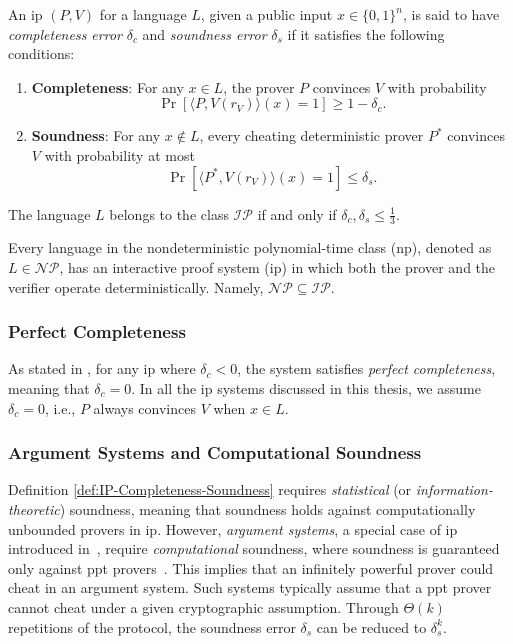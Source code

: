 \begin{definition}\label{def:IP-Completeness-Soundness}
	An \gls{ip} \( (P, V) \) for a language \( L \), given a public input \( x \in \{0,1\}^n \), is said to have \textit{completeness error} \( \delta_c \) and \textit{soundness error} \( \delta_s \) if it satisfies the following conditions:
	\begin{enumerate}[leftmargin=2em]
		\item \textbf{Completeness}: For any \( x \in L \), the prover \( P \) convinces \( V \) with probability
		\[
		\Pr [\langle P, V(r_V) \rangle (x) = 1] \geq 1 - \delta_c.
		\]
		\item \textbf{Soundness}: For any \( x \notin L \), every cheating deterministic prover \( P^* \) convinces \( V \) with probability at most
		\[
		\Pr [\langle P^*, V(r_V) \rangle (x) = 1] \leq \delta_s.
		\]
	\end{enumerate}
The language \( L \) belongs to the class \( \mathcal{IP} \) if and only if \( \delta_c, \delta_s \leq \frac{1}{3} \).

\end{definition}

\begin{remark}\label{remark:np_in_ip}
Every language in the nondeterministic polynomial-time class (\gls{np}), denoted as \( L \in \mathcal{NP} \), has an interactive proof system (\gls{ip}) in which both the prover and the verifier operate deterministically. Namely, $\mathcal{NP} \subseteq \mathcal{IP}$.
\end{remark}

\subsubsection{Perfect Completeness}
As stated in \cite{Thaler2022Proofs}, for any \gls{ip} where \( \delta_c < 0 \), the system satisfies \textit{perfect completeness}, meaning that \( \delta_c = 0 \). In all the \gls{ip} systems discussed in this thesis, we assume \(\delta_c = 0\), i.e.,  \( P \) always convinces \( V \) when \( x \in L \). 

\subsubsection{Argument Systems and Computational Soundness}
Definition \ref{def:IP-Completeness-Soundness} requires \textit{statistical} (or \textit{information-theoretic}) soundness, meaning that soundness holds against computationally unbounded provers in \gls{ip}. However, \textit{argument systems}, a special case of \gls{ip} introduced in~\cite{BRASSARD1988Minimum}, require \textit{computational} soundness, where soundness is guaranteed only against \gls{ppt} provers~\cite{Ben-Sasson2016IOP}. This implies that an infinitely powerful prover could cheat in an argument system. Such systems typically assume that a \gls{ppt} prover cannot cheat under a given cryptographic assumption. Through $\Theta(k)$ repetitions of the protocol, the soundness error $\delta_s$ can be reduced to $\delta_s^k$.

